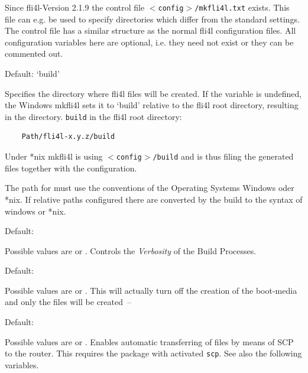   Since fli4l-Version 2.1.9 the control file
  \texttt{$<$config$>$/mkfli4l.txt} exists. This file can e.g. be used to specify
  directories which differ from the standard settings.
  The control file has a similar structure as the normal fli4l configuration files.
  All configuration variables here are optional, i.e. they need not exist or they can be commented out.
  \begin{description}


  Default: `build'

  Specifies the directory where fli4l files will be created. If the variable is undefined,
  the Windows mkfli4l sets it to `build' relative to the fli4l root directory, resulting in
  the directory.
  \texttt{build} in the fli4l root directory:
  \begin{verbatim}
    Path/fli4l-x.y.z/build
  \end{verbatim}
  \vspace{-2ex}
  Under *nix mkfli4l is using \texttt{$<$config$>$/build} and is thus filing the
  generated files together with the configuration.

  The path for  must use the conventions of the Operating Systems
  Windows oder *nix. If relative paths configured there are converted by the build
  to the syntax of windows or *nix.


  Default: 

  Possible values are  or . Controls the \emph{Verbosity}
  of the Build Processes.


  Default: 

  Possible values are  or . This will actually
  turn off the creation of the boot-media and only the files will be created~--


  Default: 

  Possible values are  or . Enables automatic
  transferring of files by means of SCP to the router. This requires
  the package  with activated \texttt{scp}.
  See also the following variables.


\end{description}
